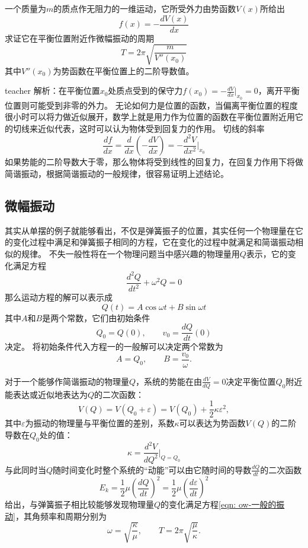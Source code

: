 \begin{example}
一个质量为$m$的质点作无阻力的一维运动，它所受外力由势函数$V(x)$所给出
\[f(x) = -\frac{dV(x)}{dx}\]
求证它在平衡位置附近作微幅振动的周期
\[T=2\pi\sqrt{\frac{m}{V''(x_0)}} \]
其中$V''(x_0)$为势函数在平衡位置上的二阶导数值。
\begin{taggedblock}{teacher}
\newline
解析：在平衡位置$x_0$处质点受到的保守力$f(x_0) = -\frac{dV}{dx}\bigg |_{x_0} = 0$，离开平衡位置则可能受到非零的外力。
无论如何力是位置的函数，当偏离平衡位置的程度很小时可以将力做近似展开，数学上就是用力作为位置的函数在平衡位置附近用它的切线来近似代表，这时可以认为物体受到回复力的作用。
切线的斜率
\[ \frac{df}{dx} = \frac{d}{dx}(-\frac{dV}{dx}) = -\frac{d^2V}{dx^2}\bigg |_{x_0}  \]
如果势能的二阶导数大于零，那么物体将受到线性的回复力，在回复力作用下将做简谐振动，根据简谐振动的一般规律，很容易证明上述结论。
\end{taggedblock}
\end{example}

\subsection{微幅振动}
其实从单摆的例子就能够看出，不仅是弹簧振子的位置，其实任何一个物理量在它的变化过程中满足和弹簧振子相同的方程，它在变化的过程中就满足和简谐振动相似的规律。
不失一般性将在一个物理问题当中感兴趣的物理量用$Q$表示，它的变化满足方程
\begin{equation}
\frac{d^2Q}{dt^2}+\omega^2Q=0
\end{equation}
那么运动方程的解可以表示成
\begin{equation}\label{eqn: ow-一般的振动}
Q(t) = A\cos\omega t+B\sin\omega t
\end{equation}
其中$A$和$B$是两个常数，它们由初始条件
\[
Q_0=Q(0),\qquad  v_0=\frac{dQ}{dt}(0)
\]
决定。
将初始条件代入方程一的一般解可以决定两个常数为
\[ A = Q_0,\qquad B = \frac{v_0}{\omega}. \]

对于一个能够作简谐振动的物理量$Q$，系统的势能在由$\frac{dV}{dQ}=0$决定平衡位置$Q_0$附近能表达或近似地表达为$Q$的二次函数：
\begin{equation}
V(Q) = V(Q_0+\varepsilon) = V(Q_0)+\frac{1}{2}\kappa\varepsilon^2,
\end{equation}
其中$\varepsilon$为振动的物理量与平衡位置的差别，系数$\kappa$可以表达为势函数$V(Q)$的二阶导数在$Q_0$处的值：
\begin{equation}
\kappa = \frac{d^2V}{dQ^2}\bigg|_{Q=Q_0}
\end{equation}
与此同时当$Q$随时间变化时整个系统的“动能”可以由它随时间的导数$\frac{dQ}{dt}$的二次函数
\begin{equation}
E_k = \frac{1}{2}\mu \left(\frac{dQ}{dt}\right)^2=\frac{1}{2}\mu \left(\frac{d\varepsilon}{dt}\right)^2
\end{equation}
给出，与弹簧振子相比较能够发现物理量$Q$的变化满足方程\ref{eqn: ow-一般的振动}，其角频率和周期分别为
\begin{equation}
\omega = \sqrt{\frac{\kappa}{\mu}},\qquad T = 2\pi\sqrt{\frac{\mu}{\kappa}}.
\end{equation}

